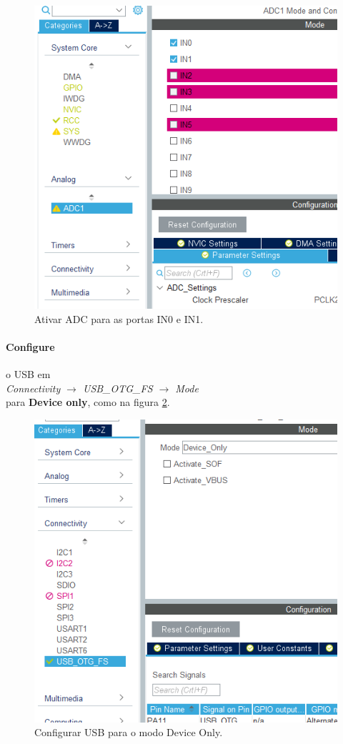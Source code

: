 \documentclass[a4paper,twocolumn,twoside,11pt]{article}
\begin{document}
\begin{figure}[H]
  \centering
  \includegraphics[width=0.8\linewidth]{1_cube_adc.png}
  \caption{Ativar ADC para as portas IN0 e IN1.}
  \label{fig:ex1}
\end{figure}

\paragraph{Configure} o USB em \\ \textit{Connectivity $\rightarrow$ USB\_OTG\_FS $\rightarrow$ Mode}\\ para \textbf{Device only}, como na figura \ref{fig:ex2}.

\begin{figure}[H]
  \centering
  \includegraphics[width=0.8\linewidth]{2_cube_USB_Device.png}
  \caption{Configurar USB para o modo Device Only.}
  \label{fig:ex2}
\end{figure}
\end{document}
